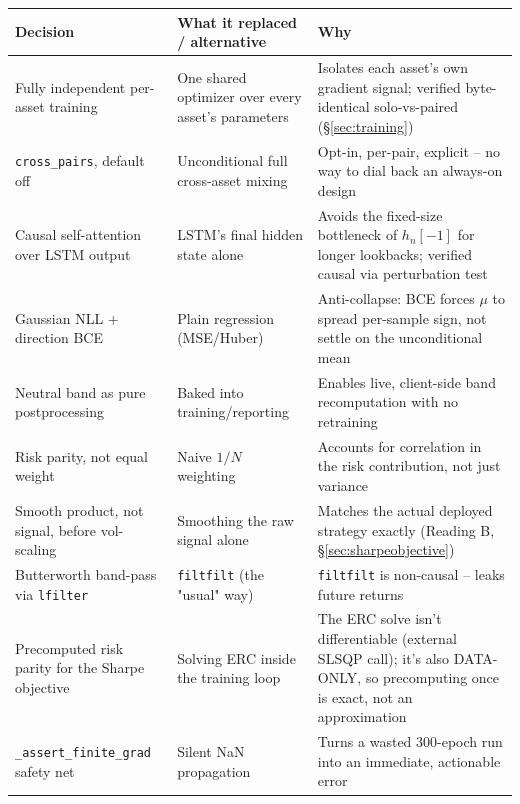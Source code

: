 \documentclass[11pt]{article}
\newcommand{\code}[1]{\texttt{\small #1}}
\begin{document}
\begin{center}
\renewcommand{\arraystretch}{1.3}
\small
\begin{longtable}{@{}p{4.0cm}p{5.6cm}p{5.6cm}@{}}
\toprule
\textbf{Decision} & \textbf{What it replaced / alternative} & \textbf{Why} \\
\midrule
\endhead
Fully independent per-asset training & One shared optimizer over every asset's parameters & Isolates each asset's own gradient signal; verified byte-identical solo-vs-paired (\S\ref{sec:training}) \\
\code{cross\_pairs}, default off & Unconditional full cross-asset mixing & Opt-in, per-pair, explicit -- no way to dial back an always-on design \\
Causal self-attention over LSTM output & LSTM's final hidden state alone & Avoids the fixed-size bottleneck of $h_n[-1]$ for longer lookbacks; verified causal via perturbation test \\
Gaussian NLL + direction BCE & Plain regression (MSE/Huber) & Anti-collapse: BCE forces $\mu$ to spread per-sample sign, not settle on the unconditional mean \\
Neutral band as pure postprocessing & Baked into training/reporting & Enables live, client-side band recomputation with no retraining \\
Risk parity, not equal weight & Naive $1/N$ weighting & Accounts for correlation in the risk contribution, not just variance \\
Smooth product, not signal, before vol-scaling & Smoothing the raw signal alone & Matches the actual deployed strategy exactly (Reading B, \S\ref{sec:sharpeobjective}) \\
Butterworth band-pass via \code{lfilter} & \code{filtfilt} (the "usual" way) & \code{filtfilt} is non-causal -- leaks future returns \\
Precomputed risk parity for the Sharpe objective & Solving ERC inside the training loop & The ERC solve isn't differentiable (external SLSQP call); it's also DATA-ONLY, so precomputing once is exact, not an approximation \\
\code{\_assert\_finite\_grad} safety net & Silent NaN propagation & Turns a wasted 300-epoch run into an immediate, actionable error \\
\bottomrule
\end{longtable}
\end{center}
\end{document}
